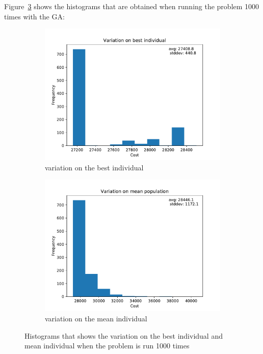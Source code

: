 \documentclass[a4paper,10pt]{article}
\begin{document}
% 
Figure~\ref{fig:variations} shows the histograms that are obtained when running the problem 1000 times with the GA:
\begin{figure}[H]
    \begin{subfigure}{0.55\linewidth}
      \centering
      \includegraphics[width=\linewidth]{img/variationbest.pdf}
      \caption{variation on the best individual}
      \label{fig:variationbest}
    \end{subfigure}
    \begin{subfigure}{0.5\linewidth}
      \centering
      \includegraphics[width=\linewidth]{img/variationmean2.pdf      }
      \caption{variation on the mean individual}
      \label{fig:variationmean}
    \end{subfigure}
    \caption{Histograms that shows the variation on the best individual and mean individual when the problem is run 1000 times}
    \label{fig:variations}
  \end{figure}
\end{document}
